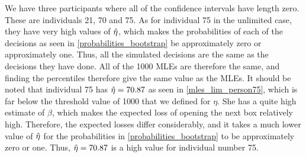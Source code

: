 We have three participants where all of the confidence intervals have length zero. These are individuals 21, 70 and 75. As for individual 75 in the unlimited case, they have very high values of $\hat{\eta}$, which makes the probabilities of each of the decisions as seen in \eqref{probabilities_bootstrap} be approximately zero or approximately one. Thus, all the simulated decisions are the same as the decisions they have done. All of the 1000 MLEs are therefore the same, and finding the percentiles therefore give the same value as the MLEs. It should be noted that individual 75 has $\hat{\eta}=70.87$ as seen in \ref{mles_lim_person75}, which is far below the threshold value of 1000 that we defined for $\eta$. She has a quite high estimate of $\beta$, which makes the expected loss of opening the next box relatively high. Therefore, the expected losses differ considerably, and it takes a much lower value of $\hat{\eta}$ for the probabilities in \eqref{probabilities_bootstrap} to be approximately zero or one. Thus, $\hat{\eta}=70.87$ is a high value for individual number 75.


